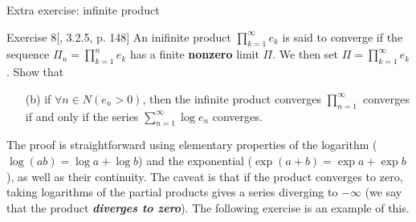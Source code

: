 \vspace{1em}

{\Large Extra exercise: infinite product}\vspace{1em}

\begin{thing4}{Exercise 8}[\cite{zo1}, 3.2.5, p. 148]\leavevmode
An inifinite product $\prod_{k=1}^\infty e_k$ is said to converge if the sequence $\Pi_n=\prod_{k=1}^n e_k$ has a finite \textbf{nonzero} limit $\Pi$. We then set $\Pi=\prod_{k=1}^\infty e_k$. Show that
\begin{enumerate}[label=(\alph*)]
	\item[(b)]  if $\forall n \in N (e_n>0)$, then the infinite product converges $\prod_{n=1}^\infty$ converges if and only if the series  $\sum_{n=1}^\infty \operatorname{log}e_n$ converges.
\end{enumerate}
\end{thing4}

\begin{remark}\leavevmode
The proof is straightforward using elementary properties of the logarithm ($\operatorname{log}(ab)=\operatorname{log}a+\operatorname{log}b$) and the exponential ($\operatorname{exp}(a+b)=\operatorname{exp}a+\operatorname{exp}b$), as well as their continuity. The caveat is that if the product converges to zero, taking logarithms of the partial products gives a series diverging to $-\infty$ (we say that the product \textit{\textbf{diverges to zero}}). The following exercise is an example of this.
\end{remark}

